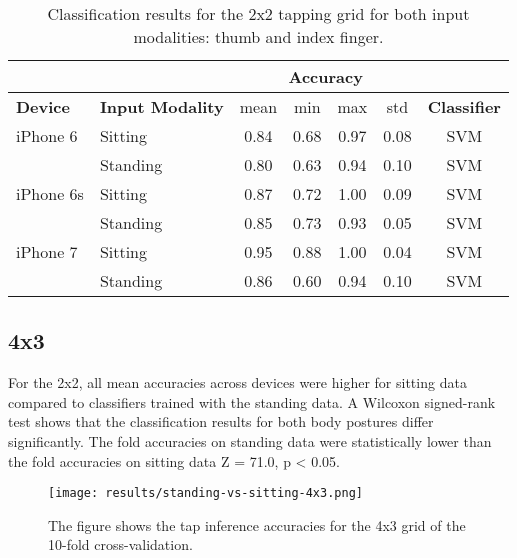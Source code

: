   \begin{table}[h!]
    \centering
  \begin{tabular}{|l|l|c|c|c|c|c|}
    \cline{3-6}
    \multicolumn{2}{c}{} & \multicolumn{4}{|c|}{\textbf{Accuracy}}  \\
    \hline
    \textbf{Device} & \textbf{Input Modality} & mean &   min &   max  & std &  \textbf{Classifier} \\
    \hline
    iPhone 6 & Sitting &  0.84 &     0.68 &     0.97 &     0.08 &  SVM \\
    & Standing &      0.80 &     0.63 &     0.94 &     0.10 &  SVM \\
    \hline
    iPhone 6s & Sitting &      0.87 &     0.72 &     1.00 &     0.09 &  SVM \\
    & Standing &      0.85 &     0.73 &     0.93 &     0.05 &  SVM \\
    \hline
    iPhone 7 & Sitting &      0.95 &     0.88 &     1.00 &     0.04 &  SVM \\
    & Standing &      0.86 &     0.60 &     0.94 &     0.10 &  SVM \\
    \hline
  \end{tabular}
    \caption*{Classification results for the 2x2 tapping grid for both input modalities: thumb and index finger.}
  \end{table}
  
  
  \subsection*{4x3}
  For the 2x2, all mean accuracies across devices were higher for sitting data compared to classifiers trained with the standing data. A Wilcoxon signed-rank test shows that the classification results for both body postures differ significantly. The fold accuracies on standing data were statistically lower than the fold accuracies on sitting data Z = 71.0, p < 0.05.
  
  \begin{figure}[h!]
    \centering
    \texttt{[image: results/standing-vs-sitting-4x3.png]}
    \caption*{The figure shows the tap inference accuracies for the 4x3 grid of the 10-fold cross-validation.} \label{fig:participation}
  \end{figure}
  
